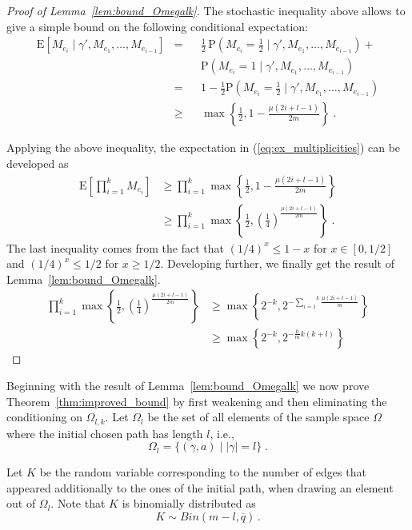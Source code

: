 \documentclass{article}
\newcommand\ex{\mathrm{E}}
\newcommand\prob{\mathrm{P}}
\begin{document}
\begin{proof}[Proof of Lemma~\ref{lem:bound_Omegalk}]
The stochastic inequality above allows to give a simple
bound on the following conditional expectation:
\begin{equation*}
\begin{aligned}
\ex[M_{e_i}\mid \gamma',M_{e_{1}},\dots,M_{e_{i-1}}]
&=&&\frac{1}{2} \, \prob\left(M_{e_i}=\frac{1}{2} \mid \gamma',M_{e_1},\dots,M_{e_{i-1}}\right)+\\
&&&\prob\left(M_{e_i}=1 \mid \gamma',M_{e_{1}},\dots,M_{e_{i-1}}\right)\\
&=&&1-\frac{1}{2}\prob\left(M_{e_i}=\frac{1}{2} \mid \gamma', M_{e_1},\dots,M_{e_{i-1}}\right)\\
&\geq&& \max\left\{\frac{1}{2},1-\frac{\mu(2i+l-1)}{2m}\right\}\;.
\end{aligned}
\end{equation*}

Applying the above inequality, the expectation in
(\ref{eq:ex_multiplicities}) can be developed as
\begin{align*}
\ex\left[\prod_{i=1}^k M_{e_i}\right] &\geq
\prod_{i=1}^k\max\left\{\frac{1}{2},1-\frac{\mu(2i+l-1)}{2m}\right\}\\
&\geq \prod_{i=1}^k\max\left\{\frac{1}{2},\left(\frac{1}{4}\right)^{\frac{\mu(2i+l-1)}{2m}}\right\}\;.
\end{align*}
The last inequality comes from the fact that $(1/4)^x
\leq 1-x$ for $x\in[0,1/2]$ and $(1/4)^x\leq 1/2$ for $x\geq
1/2$.
Developing further, we finally get the result of
Lemma~\ref{lem:bound_Omegalk}.
\begin{align*}
\prod_{i=1}^k\max\left\{\frac{1}{2},\left(\frac{1}{4}\right)^{\frac{\mu(2i+l-1)}{2m}}\right\}
&\geq \max\left\{2^{-k},2^{-\overset{k}{\underset{i=1}{\sum}}\frac{\mu(2i+l-1)}{m}}\right\}\\
&\geq \max\left\{2^{-k},2^{-\frac{\mu}{m}k(k+l)}\right\}
\end{align*}
\end{proof}

Beginning with the result of Lemma~\ref{lem:bound_Omegalk}
we now prove Theorem~\ref{thm:improved_bound} by first weakening and
then eliminating the conditioning on $\Omega_{l,k}$.
Let $\Omega_l$ be the set of all elements of the sample
space $\Omega$ where the initial chosen path has length
$l$, i.e.,
\begin{equation*}
\Omega_l=\{(\gamma,a)\mid |\gamma|=l\}\;.
\end{equation*}

Let $K$ be the random variable corresponding to the number
of edges that appeared additionally to the ones of the
initial path, when drawing an element out of $\Omega_l$.
Note that $K$ is binomially distributed as
\begin{equation*}
K\sim Bin(m-l,\overline{q})\, .
\end{equation*}
\end{document}
